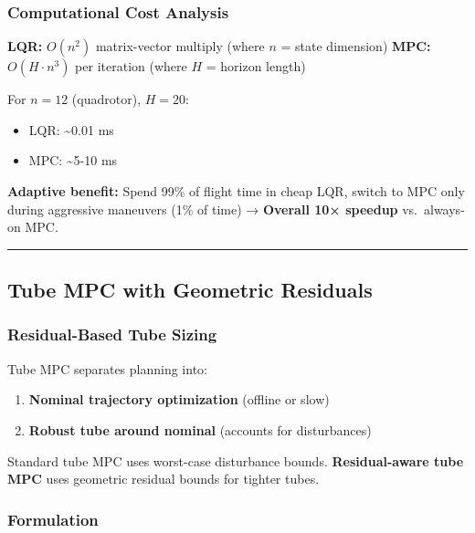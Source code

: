 \documentclass[
  letterpaper,
  DIV=11,
  numbers=noendperiod]{scrartcl}
\providecommand{\tightlist}{%
  \setlength{\itemsep}{0pt}\setlength{\parskip}{0pt}}\usepackage{longtable,booktabs,array}
\begin{document}
\subsubsection{Computational Cost
Analysis}\label{computational-cost-analysis}

\textbf{LQR:} \(O(n^2)\) matrix-vector multiply (where \(n\) = state
dimension) \textbf{MPC:} \(O(H \cdot n^3)\) per iteration (where \(H\) =
horizon length)

For \(n=12\) (quadrotor), \(H=20\):

\begin{itemize}
\tightlist
\item
  LQR: \textasciitilde0.01 ms
\item
  MPC: \textasciitilde5-10 ms
\end{itemize}

\textbf{Adaptive benefit:} Spend 99\% of flight time in cheap LQR,
switch to MPC only during aggressive maneuvers (1\% of time) →
\textbf{Overall 10× speedup} vs.~always-on MPC.

\begin{center}\rule{0.5\linewidth}{0.5pt}\end{center}

\subsection{Tube MPC with Geometric Residuals}\label{sec-tube-mpc}

\subsubsection{Residual-Based Tube
Sizing}\label{residual-based-tube-sizing}

Tube MPC separates planning into:

\begin{enumerate}
\def\labelenumi{\arabic{enumi}.}
\tightlist
\item
  \textbf{Nominal trajectory optimization} (offline or slow)
\item
  \textbf{Robust tube around nominal} (accounts for disturbances)
\end{enumerate}

Standard tube MPC uses worst-case disturbance bounds.
\textbf{Residual-aware tube MPC} uses geometric residual bounds for
tighter tubes.

\subsubsection{Formulation}\label{formulation}
\end{document}
